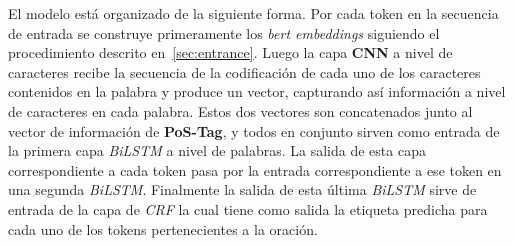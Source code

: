 El modelo est\'a organizado de la siguiente forma. Por cada token en la secuencia de entrada se construye primeramente los \emph{bert embeddings} siguiendo el procedimiento descrito en~\ref{sec:entrance}. Luego la capa \textbf{CNN} a nivel de caracteres recibe la secuencia de la codificaci\'on de cada uno de los caracteres contenidos en la palabra y produce un vector, capturando as\'i informaci\'on a nivel de caracteres en cada palabra. Estos dos vectores son concatenados junto al vector de informaci\'on de \textbf{PoS-Tag}, y todos en conjunto sirven como entrada de la primera capa \emph{BiLSTM} a nivel de palabras. La salida de esta capa correspondiente a cada token pasa por la entrada correspondiente a ese token en una segunda \emph{BiLSTM}. Finalmente la salida de esta \'ultima \emph{BiLSTM} sirve de entrada de la capa de \emph{CRF} la cual tiene como salida la etiqueta predicha para cada uno de los tokens pertenecientes a la oraci\'on. 

